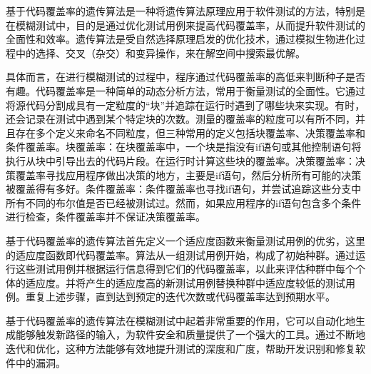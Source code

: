 基于代码覆盖率的遗传算法是一种将遗传算法原理应用于软件测试的方法，特别是在模糊测试中，目的是通过优化测试用例来提高代码覆盖率，从而提升软件测试的全面性和效率。遗传算法是受自然选择原理启发的优化技术，通过模拟生物进化过程中的选择、交叉（杂交）和变异操作，来在解空间中搜索最优解。

具体而言，在进行模糊测试的过程中，程序通过代码覆盖率的高低来判断种子是否有趣。代码覆盖率是一种简单的动态分析方法，常用于衡量测试的全面性。它通过将源代码分割成具有一定粒度的“块”并追踪在运行时遇到了哪些块来实现。有时，还会记录在测试中遇到某个特定块的次数。测量的覆盖率的粒度可以有所不同，并且存在多个定义来命名不同粒度，但三种常用的定义包括块覆盖率、决策覆盖率和条件覆盖率。块覆盖率：在块覆盖率中，一个块是指没有if语句或其他控制语句将执行从块中引导出去的代码片段。在运行时计算这些块的覆盖率。决策覆盖率：决策覆盖率寻找应用程序做出决策的地方，主要是if语句，然后分析所有可能的决策被覆盖得有多好。条件覆盖率：条件覆盖率也寻找if语句，并尝试追踪这些分支中所有不同的布尔值是否已经被测试过。然而，如果应用程序的if语句包含多个条件进行检查，条件覆盖率并不保证决策覆盖率。

基于代码覆盖率的遗传算法首先定义一个适应度函数来衡量测试用例的优劣，这里的适应度函数即代码覆盖率。算法从一组测试用例开始，构成了初始种群。通过运行这些测试用例并根据运行信息得到它们的代码覆盖率，以此来评估种群中每个个体的适应度。并将产生的适应度高的新测试用例替换种群中适应度较低的测试用例。重复上述步骤，直到达到预定的迭代次数或代码覆盖率达到预期水平。

基于代码覆盖率的遗传算法在模糊测试中起着非常重要的作用，它可以自动化地生成能够触发新路径的输入，为软件安全和质量提供了一个强大的工具。通过不断地迭代和优化，这种方法能够有效地提升测试的深度和广度，帮助开发识别和修复软件中的漏洞。

